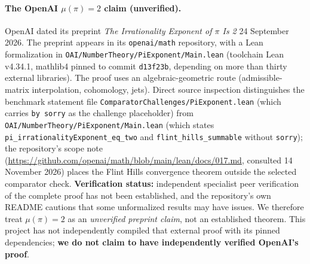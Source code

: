 \documentclass[11pt]{amsart}
\theoremstyle{definition}
\theoremstyle{remark}
\numberwithin{equation}{section}
\newcommand{\irr}{\mu}
\begin{document}
\paragraph{The OpenAI $\irr(\pi)=2$ claim (unverified).} OpenAI dated its preprint \emph{The Irrationality Exponent of $\pi$ Is 2} 24 September 2026. The preprint appears in its \texttt{openai/\allowbreak{}math} repository, with a Lean formalization in \texttt{OAI/\allowbreak{}NumberTheory/\allowbreak{}PiExponent/\allowbreak{}Main.lean} (toolchain Lean v4.34.1, mathlib4 pinned to commit \texttt{d13f23b}, depending on more than thirty external libraries). The proof uses an algebraic-geometric route (admissible-matrix interpolation, cohomology, jets). Direct source inspection distinguishes the benchmark statement file \texttt{ComparatorChallenges/\allowbreak{}PiExponent.lean} (which carries \texttt{by sorry} as the challenge placeholder) from \texttt{OAI/\allowbreak{}NumberTheory/\allowbreak{}PiExponent/\allowbreak{}Main.lean} (which states \texttt{pi\_\allowbreak{}irrationalityExponent\_\allowbreak{}eq\_\allowbreak{}two} and \texttt{flint\_\allowbreak{}hills\_\allowbreak{}summable} without \texttt{sorry}); the repository's scope note (\url{https://github.com/openai/math/blob/main/lean/docs/017.md}, consulted 14 November 2026) places the Flint Hills convergence theorem outside the selected comparator check. \textbf{Verification status:} independent specialist peer verification of the complete proof has not been established, and the repository's own README cautions that some unformalized results may have issues. We therefore treat $\irr(\pi)=2$ as an \emph{unverified preprint claim}, not an established theorem. This project has not independently compiled that external proof with its pinned dependencies; \textbf{we do not claim to have independently verified OpenAI's proof}.
\end{document}
